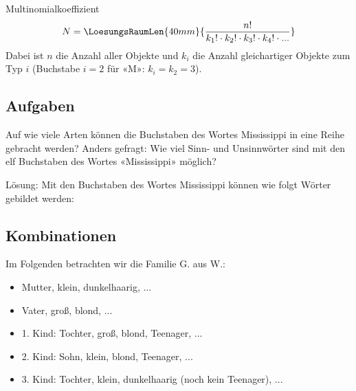 \begin{gesetz}{Multinomialkoeffizient}{}
  $$N = \LoesungsRaumLen{40mm}{\frac{n!}{k_1! \cdot{} k_2! \cdot{} k_3! \cdot{} k_4! \cdot{}  ...}}$$
  \noTRAINER{\vspace{6mm}}
  Dabei ist $n$ die Anzahl aller Objekte und $k_i$ die Anzahl
  gleichartiger Objekte zum Typ $i$ (\zB Buchstabe $i=2$  für «M»: $k_i=k_2=3$).
\end{gesetz}


\subsection*{Aufgaben}

Auf wie viele Arten können die Buchstaben des Wortes Mississippi in
eine Reihe gebracht werden? Anders gefragt: Wie viel Sinn- und
Unsinnwörter sind mit den elf Buchstaben des Wortes «Mississippi»
möglich?

Lösung: Mit den Buchstaben des Wortes
{\color{red}M}{\color{blue}i}{\color{orange}ss}{\color{blue}i}{\color{orange}ss}{\color{blue}i}{\color{violet}pp}{\color{blue}i}
können wie folgt Wörter gebildet werden:



\subsection{Kombinationen}\label{kombiKombination}
Im Folgenden betrachten wir die Familie G. aus W.:
\begin{itemize}
\item Mutter, klein, dunkelhaarig, ...
\item Vater, groß, blond, ...
\item 1. Kind: Tochter, groß, blond, Teenager, ...
\item 2. Kind: Sohn, klein, blond, Teenager, ...
\item 3. Kind: Tochter, klein, dunkelhaarig (noch kein Teenager), ...
\end{itemize}

